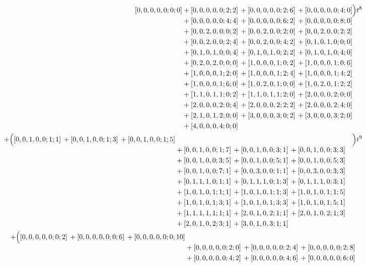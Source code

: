 \documentclass[10pt]{article}
\begin{document}
\[\begin{aligned}
\begin{aligned}[t][0,0,0,0,0;0;0]
  &{}+[0,0,0,0,0;2;2]\,+[0,0,0,0,0;2;6]\,+[0,0,0,0,0;4;0] \\
  &{}+[0,0,0,0,0;4;4]\,+[0,0,0,0,0;6;2]\,+[0,0,0,0,0;8;0] \\
  &{}+[0,0,2,0,0;0;2]\,+[0,0,2,0,0;2;0]\,+[0,0,2,0,0;2;2] \\
  &{}+[0,0,2,0,0;2;4]\,+[0,0,2,0,0;4;2]\,+[0,1,0,1,0;0;0] \\
  &{}+[0,1,0,1,0;0;4]\,+[0,1,0,1,0;2;2]\,+[0,1,0,1,0;4;0] \\
  &{}+[0,2,0,2,0;0;0]\,+[1,0,0,0,1;0;2]\,+[1,0,0,0,1;0;6] \\
  &{}+[1,0,0,0,1;2;0]\,+[1,0,0,0,1;2;4]\,+[1,0,0,0,1;4;2] \\
  &{}+[1,0,0,0,1;6;0]\,+[1,0,2,0,1;0;0]\,+[1,0,2,0,1;2;2] \\
  &{}+[1,1,0,1,1;0;2]\,+[1,1,0,1,1;2;0]\,+[2,0,0,0,2;0;0] \\
  &{}+[2,0,0,0,2;0;4]\,+[2,0,0,0,2;2;2]\,+[2,0,0,0,2;4;0] \\
  &{}+[2,1,0,1,2;0;0]\,+[3,0,0,0,3;0;2]\,+[3,0,0,0,3;2;0] \\
  &{}+[4,0,0,0,4;0;0]\end{aligned}\Bigr)t^{8} \\
  + \Bigl(\begin{aligned}[t][0,0,1,0,0;1;1]\,+[0,0,1,0,0;1;3]\,+[0,0,1,0,0;1;5] \\
  &{}+[0,0,1,0,0;1;7]\,+[0,0,1,0,0;3;1]\,+[0,0,1,0,0;3;3] \\
  &{}+[0,0,1,0,0;3;5]\,+[0,0,1,0,0;5;1]\,+[0,0,1,0,0;5;3] \\
  &{}+[0,0,1,0,0;7;1]\,+[0,0,3,0,0;1;1]\,+[0,0,3,0,0;3;3] \\
  &{}+[0,1,1,1,0;1;1]\,+[0,1,1,1,0;1;3]\,+[0,1,1,1,0;3;1] \\
  &{}+[1,0,1,0,1;1;1]\,+[1,0,1,0,1;1;3]\,+[1,0,1,0,1;1;5] \\
  &{}+[1,0,1,0,1;3;1]\,+[1,0,1,0,1;3;3]\,+[1,0,1,0,1;5;1] \\
  &{}+[1,1,1,1,1;1;1]\,+[2,0,1,0,2;1;1]\,+[2,0,1,0,2;1;3] \\
  &{}+[2,0,1,0,2;3;1]\,+[3,0,1,0,3;1;1]\end{aligned}\Bigr)t^{9} \\
  + \Bigl(\begin{aligned}[t][0,0,0,0,0;0;2]\,+[0,0,0,0,0;0;6]\,+[0,0,0,0,0;0;10] \\
  &{}+[0,0,0,0,0;2;0]\,+[0,0,0,0,0;2;4]\,+[0,0,0,0,0;2;8] \\
  &{}+[0,0,0,0,0;4;2]\,+[0,0,0,0,0;4;6]\,+[0,0,0,0,0;6;0] \\

\end{aligned}
\end{aligned}\]
\end{document}
